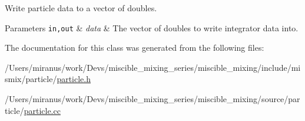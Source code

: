 Write particle data to a vector of doubles. 


\begin{DoxyParams}[1]{Parameters}
\mbox{\tt in,out}  & {\em data} & The vector of doubles to write integrator data into. \\
\hline
\end{DoxyParams}


The documentation for this class was generated from the following files\+:\begin{DoxyCompactItemize}
\item 
/\+Users/miranus/work/\+Devs/miscible\+\_\+mixing\+\_\+series/miscible\+\_\+mixing/include/mismix/particle/\hyperlink{particle_8h}{particle.\+h}\item 
/\+Users/miranus/work/\+Devs/miscible\+\_\+mixing\+\_\+series/miscible\+\_\+mixing/source/particle/\hyperlink{particle_8cc}{particle.\+cc}\end{DoxyCompactItemize}
